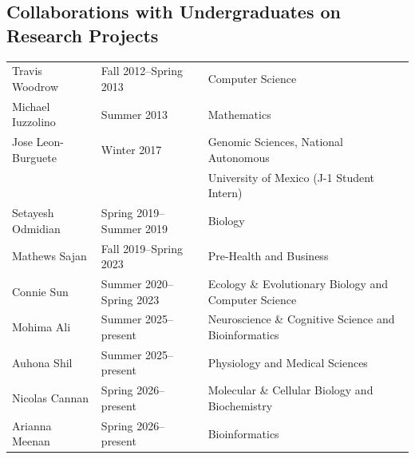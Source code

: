 \documentclass[11pt]{article}
\begin{document}
\subsection*{Collaborations with Undergraduates on Research Projects}
\begin{longtable}[l]{l l l}
Travis Woodrow & Fall 2012--Spring 2013 & Computer Science\\
Michael Iuzzolino & Summer 2013 & Mathematics\\
Jose Leon-Burguete & Winter 2017 & Genomic Sciences, National Autonomous\\ 
                   &             & University of Mexico (J-1 Student Intern)\\
Setayesh Odmidian & Spring 2019--Summer 2019 & Biology\\
Mathews Sajan & Fall 2019--Spring 2023 & Pre-Health and Business\\
Connie Sun & Summer 2020--Spring 2023 & Ecology \& Evolutionary Biology and Computer Science\\
Mohima Ali & Summer 2025--present & Neuroscience \& Cognitive Science and Bioinformatics\\
Auhona Shil & Summer 2025--present & Physiology and Medical Sciences\\
Nicolas Cannan & Spring 2026--present & Molecular \& Cellular Biology and Biochemistry\\
Arianna Meenan & Spring 2026--present & Bioinformatics\\
\end{longtable}
\end{document}
